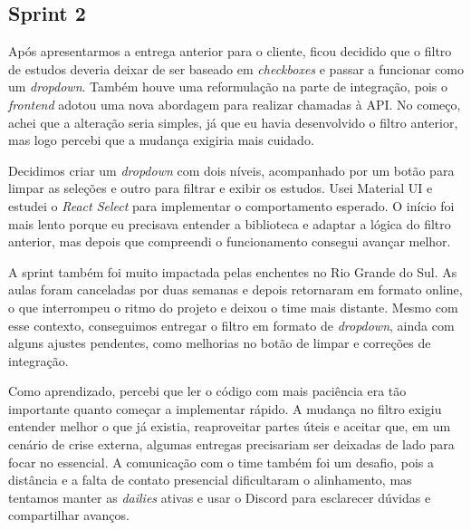 \subsection{Sprint 2}

Após apresentarmos a entrega anterior para o cliente, ficou decidido que o filtro de estudos deveria deixar de ser baseado em \textit{checkboxes} e passar a funcionar como um \textit{dropdown}. Também houve uma reformulação na parte de integração, pois o \textit{frontend} adotou uma nova abordagem para realizar chamadas à API. No começo, achei que a alteração seria simples, já que eu havia desenvolvido o filtro anterior, mas logo percebi que a mudança exigiria mais cuidado.

Decidimos criar um \textit{dropdown} com dois níveis, acompanhado por um botão para limpar as seleções e outro para filtrar e exibir os estudos. Usei Material UI \cite{materialui} e estudei o \textit{React Select} para implementar o comportamento esperado. O início foi mais lento porque eu precisava entender a biblioteca e adaptar a lógica do filtro anterior, mas depois que compreendi o funcionamento consegui avançar melhor.

A sprint também foi muito impactada pelas enchentes no Rio Grande do Sul. As aulas foram canceladas por duas semanas e depois retornaram em formato online, o que interrompeu o ritmo do projeto e deixou o time mais distante. Mesmo com esse contexto, conseguimos entregar o filtro em formato de \textit{dropdown}, ainda com alguns ajustes pendentes, como melhorias no botão de limpar e correções de integração.

Como aprendizado, percebi que ler o código com mais paciência era tão importante quanto começar a implementar rápido. A mudança no filtro exigiu entender melhor o que já existia, reaproveitar partes úteis e aceitar que, em um cenário de crise externa, algumas entregas precisariam ser deixadas de lado para focar no essencial. A comunicação com o time também foi um desafio, pois a distância e a falta de contato presencial dificultaram o alinhamento, mas tentamos manter as \textit{dailies} ativas e usar o Discord para esclarecer dúvidas e compartilhar avanços.
